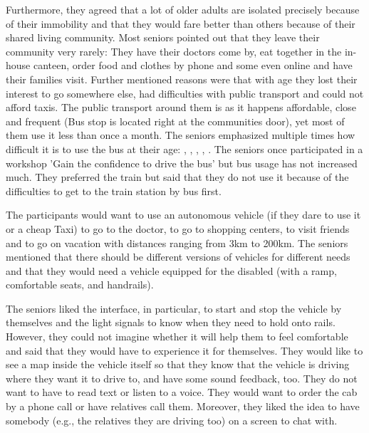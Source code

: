 Furthermore, they agreed that a lot of older adults are isolated precisely because of their immobility and that they would fare better than others because of their shared living community. Most seniors pointed out that they leave their community very rarely: They have their doctors come by, eat together in the in-house canteen, order food and clothes by phone and some even online and have their families visit. Further mentioned reasons were that with age they lost their interest to go somewhere else, had difficulties with public transport and could not afford taxis. The public transport around them is as it happens affordable, close and frequent (Bus stop is located right at the communities door), yet most of them use it less than once a month. The seniors emphasized multiple times how difficult it is to use the bus at their age: , , , , . The seniors once participated in a workshop 'Gain the confidence to drive the bus' but bus usage has not increased much. They preferred the train but said that they do not use it because of the difficulties to get to the train station by bus first. 

The participants would want to use an autonomous vehicle (if they dare to use it or a cheap Taxi) to go to the doctor, to go to shopping centers, to visit friends and to go on vacation with distances ranging from 3km to 200km.  
The seniors mentioned that there should be different versions of vehicles for different needs and that they would need a vehicle equipped for the disabled (with a ramp, comfortable seats, and handrails). 

The seniors liked the interface, in particular, to start and stop the vehicle by themselves and the light signals to know when they need to hold onto rails. However, they could not imagine whether it will help them to feel comfortable and said that they would have to experience it for themselves. They would like to see a map inside the vehicle itself so that they know that the vehicle is driving where they want it to drive to, and have some sound feedback, too. They do not want to have to read text or listen to a voice. They would want to order the cab by a phone call or have relatives call them. Moreover, they liked the idea to have somebody (e.g., the relatives they are driving too) on a screen to chat with. 


